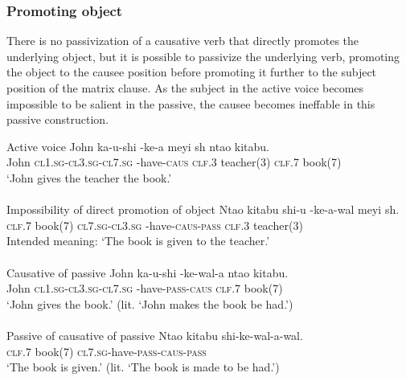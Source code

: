 \subsubsection{Promoting object}

There is no passivization of a causative verb that directly promotes the underlying object, but it is possible to passivize the underlying verb, promoting the object to the causee position before promoting it further to the subject position of the matrix clause. As the subject in the active voice becomes impossible to be salient in the passive, the causee becomes ineffable in this passive construction.

\begin{exe}
\ex
\begin{xlist}
\ex Active voice
\gll John ka-u-shi -ke-\textbeltl a meyi {sh\textramshorns} nta\textbeltl o kitabu. \\
John \textsc{cl1.sg}-\textsc{cl3.sg}-\textsc{cl7.sg} -have-\textsc{caus} \textsc{clf.3} teacher(3) \textsc{clf.7} book(7) \\
\trans `John gives the teacher the book.' \\

\ 
\\

\ex Impossibility of direct promotion of object
\gll * Nta\textbeltl o kitabu shi-u {-ke-\textbeltl a-wal\textramshorns} meyi sh\textramshorns. \\
{} \textsc{clf.7} book(7) \textsc{cl7.sg}-\textsc{cl3.sg} -have-\textsc{caus}-\textsc{pass} \textsc{clf.3} teacher(3) \\
\trans Intended meaning: `The book is given to the teacher.' \\

\ 
\\

\ex Causative of passive
\gll John ka-u-shi -ke-wal\textramshorns-\textbeltl a nta\textbeltl o kitabu. \\
John \textsc{cl1.sg}-\textsc{cl3.sg}-\textsc{cl7.sg} -have-\textsc{pass}-\textsc{caus} \textsc{clf.7} book(7) \\
\trans `John gives the book.' (lit. `John makes the book be had.') \\

\ 
\\

\ex Passive of causative of passive
\gll Nta\textbeltl o kitabu shi-ke-wal\textramshorns-\textbeltl a-wal\textramshorns. \\
\textsc{clf.7} book(7) \textsc{cl7.sg}-have-\textsc{pass}-\textsc{caus}-\textsc{pass} \\
\trans `The book is given.' (lit. `The book is made to be had.') \\


\end{xlist}
\end{exe}
